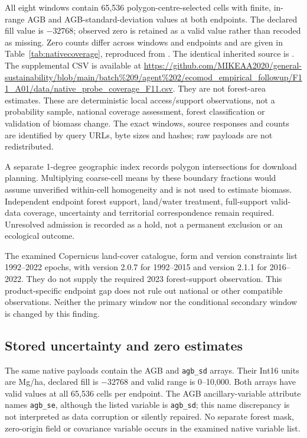 \documentclass[11pt,a4paper]{article}
\begin{document}
All eight windows contain 65,536 polygon-centre-selected cells with finite, in-range AGB and AGB-standard-deviation values at both endpoints. The declared fill value is $-32768$; observed zero is retained as a valid value rather than recoded as missing. Zero counts differ across windows and endpoints and are given in Table~\ref{tab:nativecoverage}, reproduced from . The identical inherited source is . The supplemental CSV is available at \url{https://github.com/MIKEAA2020/general-sustainability/blob/main/batch%209/agent%202/ecomod_empirical_followup/F11_A01/data/native_probe_coverage_F11.csv}. They are not forest-area estimates. These are deterministic local access/support observations, not a probability sample, national coverage assessment, forest classification or validation of biomass change. The exact windows, source responses and counts are identified by query URLs, byte sizes and hashes; raw payloads are not redistributed.



A separate 1-degree geographic index records polygon intersections for download planning. Multiplying coarse-cell means by these boundary fractions would assume unverified within-cell homogeneity and is not used to estimate biomass. Independent endpoint forest support, land/water treatment, full-support valid-data coverage, uncertainty and territorial correspondence remain required. Unresolved admission is recorded as a hold, not a permanent exclusion or an ecological outcome.

The examined Copernicus land-cover catalogue, form and version constraints list 1992--2022 epochs, with version 2.0.7 for 1992--2015 and version 2.1.1 for 2016--2022. They do not supply the required 2023 forest-support observation. This product-specific endpoint gap does not rule out national or other compatible observations. Neither the primary window nor the conditional secondary window is changed by this finding.

\subsection{Stored uncertainty and zero estimates}

The same native payloads contain the AGB and \texttt{agb\_sd} arrays. Their Int16 units are Mg/ha, declared fill is $-32768$ and valid range is 0--10,000. Both arrays have valid values at all 65,536 cells per endpoint. The AGB ancillary-variable attribute names \texttt{agb\_se}, although the listed variable is \texttt{agb\_sd}; this name discrepancy is not interpreted as data corruption or silently repaired. No separate forest mask, zero-origin field or covariance variable occurs in the examined native variable list.
\end{document}
